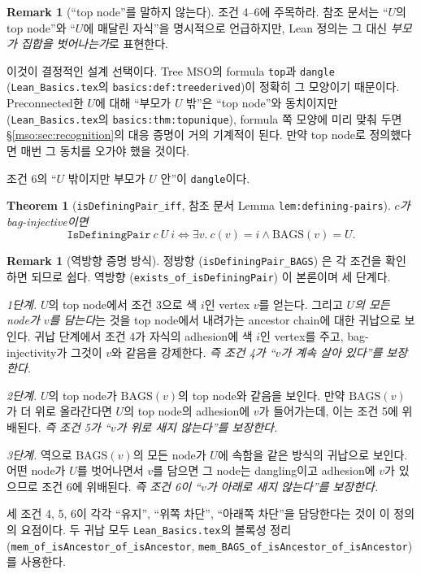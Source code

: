 \documentclass[11pt]{article}
\theoremstyle{definition}
\newtheorem{remark}[definition]{Remark}
\theoremstyle{plain}
\newtheorem{theorem}[definition]{Theorem}
\newcommand{\lean}[1]{\texttt{#1}}
\newcommand{\leanfile}[1]{\texttt{#1}}
\newcommand{\BAGS}{\mathrm{BAGS}}
\begin{document}
\begin{remark}[``top node''를 말하지 않는다]
\label{mso:rem:topbyparent}
조건 4--6에 주목하라. 참조 문서는 ``$U$의 top node''와 ``$U$에 매달린
자식''을 명시적으로 언급하지만, Lean 정의는 그 대신 \emph{부모가 집합을
벗어나는가}로 표현한다.

이것이 결정적인 설계 선택이다. Tree MSO의 formula \lean{top}과 \lean{dangle}
(\leanfile{Lean\_Basics.tex}의 \lean{basics:def:treederived})이 정확히 그
모양이기 때문이다. Preconnected한 $U$에 대해 ``부모가 $U$ 밖''은 ``top
node''와 동치이지만 (\leanfile{Lean\_Basics.tex}의
\lean{basics:thm:topunique}), formula 쪽 모양에 미리 맞춰 두면
\S\ref{mso:sec:recognition}의 대응 증명이 거의 기계적이 된다. 만약 top node로
정의했다면 매번 그 동치를 오가야 했을 것이다.

조건 6의 ``$U$ 밖이지만 부모가 $U$ 안''이 \lean{dangle}이다.
\end{remark}

\begin{theorem}[\lean{isDefiningPair\_iff}, 참조 문서 Lemma \lean{lem:defining-pairs}]
\label{mso:thm:definingpairiff}
$c$가 bag-injective이면
\[
  \lean{IsDefiningPair}\ c\ U\ i \iff \exists v.\ c(v) = i \land \BAGS(v) = U.
\]
\end{theorem}

\begin{remark}[역방향 증명 방식]
\label{mso:rem:definingpairproof}
정방향 (\lean{isDefiningPair\_BAGS}) 은 각 조건을 확인하면 되므로 쉽다.
역방향 (\lean{exists\_of\_isDefiningPair}) 이 본론이며 세 단계다.

\emph{1단계.} $U$의 top node에서 조건 3으로 색 $i$인 vertex $v$를 얻는다.
그리고 \emph{$U$의 모든 node가 $v$를 담는다}는 것을 top node에서 내려가는
ancestor chain에 대한 귀납으로 보인다. 귀납 단계에서 조건 4가 자식의 adhesion에
색 $i$인 vertex를 주고, bag-injectivity가 그것이 $v$와 같음을 강제한다.
\emph{즉 조건 4가 ``$v$가 계속 살아 있다''를 보장한다.}

\emph{2단계.} $U$의 top node가 $\BAGS(v)$의 top node와 같음을 보인다. 만약
$\BAGS(v)$가 더 위로 올라간다면 $U$의 top node의 adhesion에 $v$가 들어가는데,
이는 조건 5에 위배된다. \emph{즉 조건 5가 ``$v$가 위로 새지 않는다''를
보장한다.}

\emph{3단계.} 역으로 $\BAGS(v)$의 모든 node가 $U$에 속함을 같은 방식의 귀납으로
보인다. 어떤 node가 $U$를 벗어나면서 $v$를 담으면 그 node는 dangling이고
adhesion에 $v$가 있으므로 조건 6에 위배된다. \emph{즉 조건 6이 ``$v$가 아래로
새지 않는다''를 보장한다.}

세 조건 4, 5, 6이 각각 ``유지'', ``위쪽 차단'', ``아래쪽 차단''을 담당한다는
것이 이 정의의 요점이다. 두 귀납 모두 \leanfile{Lean\_Basics.tex}의 볼록성
정리 (\lean{mem\_of\_isAncestor\_of\_isAncestor},
\lean{mem\_BAGS\_of\_isAncestor\_of\_isAncestor}) 를 사용한다.
\end{remark}
\end{document}
